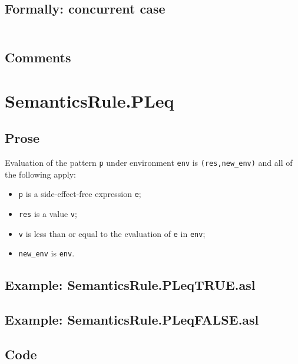 \documentclass{book}
\begin{document}
  \subsection{Formally: concurrent case}
  \begin{align}
  \end{align} 

  \subsection{Comments}

\section{SemanticsRule.PLeq \label{sec:SemanticsRule.PLeq}}

    \subsection{Prose}

   Evaluation of the pattern \texttt{p} under environment \texttt{env} is
  \texttt{(res,new\_env)} and all of the following apply:
    \begin{itemize}
    \item \texttt{p} is a side-effect-free expression \texttt{e};
    \item \texttt{res} is a value \texttt{v};
    \item \texttt{v} is less than or equal to the evaluation of \texttt{e} in \texttt{env};
    \item \texttt{new\_env} is \texttt{env}.
    \end{itemize}

    \subsection{Example: SemanticsRule.PLeqTRUE.asl}

    \subsection{Example: SemanticsRule.PLeqFALSE.asl}

  \subsection{Code}
\end{document}
